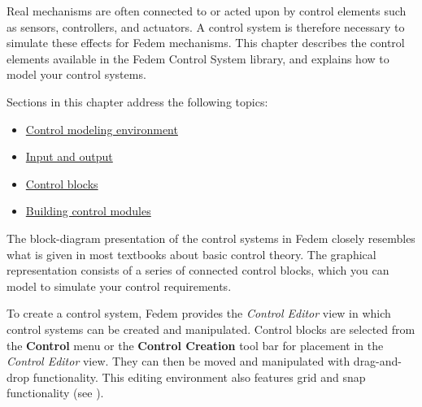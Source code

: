 %
%

%
%


Real mechanisms are often connected to or acted upon by control elements such as
sensors, controllers, and actuators. A control system is therefore necessary to
simulate these effects for Fedem mechanisms.
This chapter describes the control elements available in the Fedem Control
System library, and explains how to model your control systems.

Sections in this chapter address the following topics:

\begin{itemize}
\item
  \protect\hyperlink{control-modeling-environment}
                    {Control modeling environment}
\item
  \protect\hyperlink{input-and-output}
                    {Input and output}
\item
  \protect\hyperlink{control-blocks}
                    {Control blocks}
\item
  \protect\hyperlink{building-control-modules}
                    {Building control modules}
\end{itemize}

\clearpage



The block-diagram presentation of the control systems in Fedem closely resembles
what is given in most textbooks about basic control theory.
The graphical representation consists of a series of connected control blocks,
which you can model to simulate your control requirements.



To create a control system, Fedem provides the {\sl Control Editor} view in
which control systems can be created and manipulated. Control blocks are
selected from the \textbf{Control} menu or the \textbf{Control Creation}
tool bar for placement in the {\sl Control Editor} view.
They can then be moved and manipulated with drag-and-drop functionality.
This editing environment also features grid and snap functionality
(see ).

